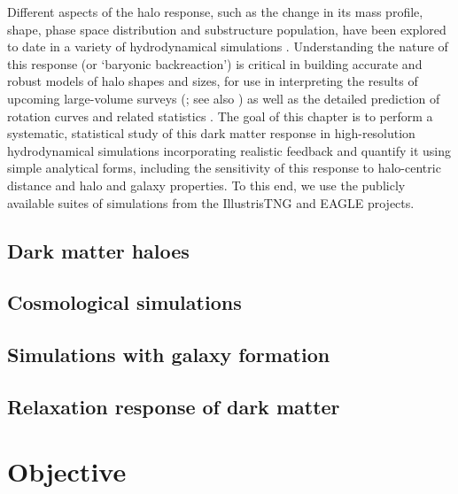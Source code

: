 Different aspects of the halo response, such as the change in its mass profile, shape, phase space distribution and substructure population, have been explored to date in a variety of hydrodynamical simulations \citep[see, e.g.,][]{2004ApJ...611L..73K,2008ApJ...681.1076D,2014MNRAS.441.2986D,2015MNRAS.451.1247S,2017MNRAS.466.3876Z,2017MNRAS.472.4343C,2019MNRAS.484..476C,2021arXiv210900012C,2021MNRAS.501.5679C,2020MNRAS.494.4291C,freundlich+20,riggs+22}.
Understanding the nature of this response (or `baryonic backreaction') is critical in building accurate and robust models of halo shapes and sizes, for use in interpreting the results of upcoming large-volume surveys (\citealp{2015JCAP...12..049S,2018MNRAS.480.3962C,2021MNRAS.503.3596A}; see also \citealp{velliscig+14,hwvh15,mead+15}) as well as the detailed prediction of rotation curves and related statistics \citep{2021MNRAS.507..632P,2021arXiv211200026P}.
The goal of this chapter is to perform a systematic, statistical study of this dark matter response in high-resolution hydrodynamical simulations incorporating realistic feedback and quantify it using simple analytical forms, including the sensitivity of this response to halo-centric distance and halo and galaxy properties. To this end, we use the publicly available suites of simulations from the IllustrisTNG and EAGLE projects. 


\subsection{Dark matter haloes}

\subsection{Cosmological simulations}

\subsection{Simulations with galaxy formation}

\subsection{Relaxation response of dark matter}

\section{Objective}


